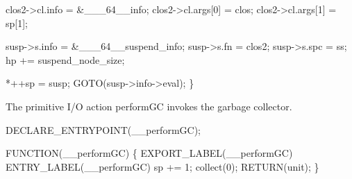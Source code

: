     clos2->cl.info    = &___64__info;
    clos2->cl.args[0] = clos;
    clos2->cl.args[1] = sp[1];

    susp->s.info = &___64__suspend_info;
    susp->s.fn   = clos2;
    susp->s.spc  = ss;
    hp          += suspend_node_size;

    *++sp = susp;
    GOTO(susp->info->eval);    
\}

\nwendcode{}\nwdocspar
The primitive I/O action {\Tt{}performGC\nwendquote} invokes the garbage collector.

\nwenddocs{}\plusendmoddef\nwstartdeflinemarkup{}\nwenddeflinemarkup
DECLARE_ENTRYPOINT(__performGC);

FUNCTION(__performGC)
\{
    EXPORT_LABEL(__performGC)
 ENTRY_LABEL(__performGC)
    sp += 1;
    collect(0);
    RETURN(unit);
\}
\nwendcode{}

%
%

